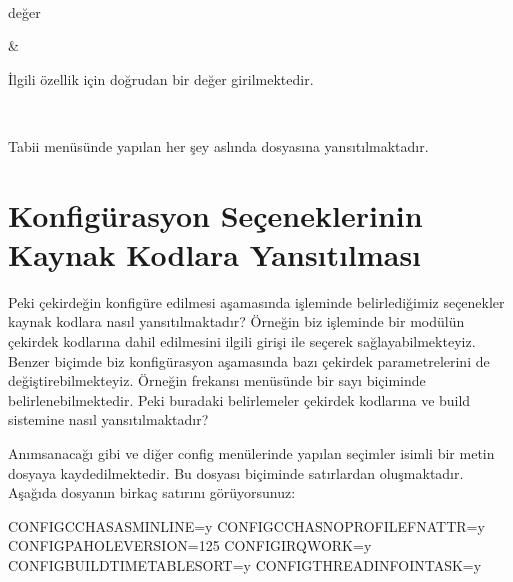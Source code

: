 \documentclass[a4paper,10pt,turkish]{sphinxmanual}
\begin{document}
\begin{savenotes}
\begin{tabular}[t]{}
\\
\sphinxhline\begin{varwidth}[t]{}
\sphinxAtStartPar
değer
\sphinxbeforeendvarwidth
\end{varwidth}%
&\begin{varwidth}[t]{}
\sphinxAtStartPar
İlgili özellik için doğrudan bir değer girilmektedir.
\sphinxbeforeendvarwidth
\end{varwidth}%
\\
\sphinxbottomrule
\end{tabular}
\sphinxtableafterendhook\par
\sphinxattableend\end{savenotes}

\sphinxAtStartPar
Tabii  menüsünde yapılan her şey aslında  dosyasına yansıtılmaktadır.


\section{Konfigürasyon Seçeneklerinin Kaynak Kodlara Yansıtılması}
\label{\detokenize{kernelcompilation:konfigurasyon-seceneklerinin-kaynak-kodlara-yansitilmasi}}
\sphinxAtStartPar
Peki çekirdeğin konfigüre edilmesi aşamasında  işleminde belirlediğimiz seçenekler
kaynak kodlara nasıl yansıtılmaktadır? Örneğin biz  işleminde bir modülün çekirdek
kodlarına dahil edilmesini ilgili girişi \sphinxcode{\sphinxupquote{*}} ile seçerek sağlayabilmekteyiz. Benzer biçimde biz
konfigürasyon aşamasında bazı çekirdek parametrelerini de değiştirebilmekteyiz. Örneğin 
frekansı  menüsünde bir sayı biçiminde belirlenebilmektedir. Peki buradaki belirlemeler
çekirdek kodlarına ve build sistemine nasıl yansıtılmaktadır?

\sphinxAtStartPar
Anımsanacağı gibi  ve diğer config menülerinde yapılan seçimler  isimli
bir metin dosyaya kaydedilmektedir. Bu  dosyası  biçiminde satırlardan
oluşmaktadır. Aşağıda dosyanın birkaç satırını görüyorsunuz:

\begin{sphinxVerbatim}[commandchars=\\\{\}]
CONFIG\PYGZus{}CC\PYGZus{}HAS\PYGZus{}ASM\PYGZus{}INLINE=y
CONFIG\PYGZus{}CC\PYGZus{}HAS\PYGZus{}NO\PYGZus{}PROFILE\PYGZus{}FN\PYGZus{}ATTR=y
CONFIG\PYGZus{}PAHOLE\PYGZus{}VERSION=125
CONFIG\PYGZus{}IRQ\PYGZus{}WORK=y
CONFIG\PYGZus{}BUILDTIME\PYGZus{}TABLE\PYGZus{}SORT=y
CONFIG\PYGZus{}THREAD\PYGZus{}INFO\PYGZus{}IN\PYGZus{}TASK=y
\end{sphinxVerbatim}
\end{document}
